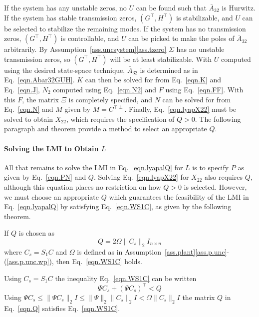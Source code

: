 \documentclass[]{../sty/JGCD}
\theoremstyle{examplestyle}
\begin{document}
  If the system has any unstable zeros, no $U$ can be found such that $\bar{A}_{32}$ is Hurwitz.
  If the system has stable transmission zeros, $(G^{\top},H^{\top})$ is stabilizable, and $U$ can be selected to stabilize the remaining modes.
  If the system has no transmission zeros, $(G^{\top},H^{\top})$ is controllable, and $U$ can be picked to make the poles of $\bar{A}_{32}$ arbitrarily.
  By Assumption~\ref{ass.uncsystem}\ref{ass.tzero} $\Sigma$ has no unstable transmission zeros, so $(G^{\top},H^{\top})$ will be at least stabilizable.
  With $U$ computed using the desired state-space technique, $\bar{A}_{32}$ is determined as in Eq.\ \eqref{eqn.Abar32GUH}.
  $K$ can then be solved for from Eq.\ \eqref{eqn.K} and Eq.\ \eqref{eqn.J}, $N_{2}$ computed using Eq.\ \eqref{eqn.N2} and $F$ using Eq.\ \eqref{eqn.FF}.
  With this $F$, the matrix $\Xi$ is completely specified, and $N$ can be solved for from Eq.\ \eqref{eqn.N} and $M$ given by $M=C^{\top\perp}$.
  Finally, Eq.\ \eqref{eqn.lyapX22} must be solved to obtain $X_{22}$, which requires the specification of $Q>0$.
  The following paragraph and theorem provide a method to select an appropriate $Q$.

  \paragraph{Solving the LMI to Obtain $L$}

  All that remains to solve the LMI in Eq.\ \eqref{eqn.lyapalQ} for $L$ is to specify $P$ as given by Eq.\ \eqref{eqn.PN} and $Q$.
  Solving Eq.\ \eqref{eqn.lyapX22} for $X_{22}$ also requires $Q$, although this equation places no restriction on how $Q>0$ is selected.
  However, we must choose an appropriate $Q$ which guarantees the feasibility of the LMI in Eq.\ \eqref{eqn.lyapalQ} by satisfying Eq.\ \eqref{eqn.WS1C}, as given by the following theorem.

  \begin{thm-dan}
    If $Q$ is chosen as
    \begin{equation}
      \label{eqn.Q}
      Q=2\Omega\|C_{s}\|_{2}I_{n\times n}
    \end{equation}
    where $C_{s}=S_{1}C$ and $\Omega$ is defined as in Assumption~\ref{ass.plant}\ref{ass.p.unc}-(\ref{ass.p.unc.wp}), then Eq.\ \eqref{eqn.WS1C} holds.
  \end{thm-dan}

  \begin{proof-dan}
    Using $C_{s}=S_{1}C$ the inequality Eq.\ \eqref{eqn.WS1C} can be written
    \begin{equation*}
      \Psi C_{s}+(\Psi C_{s})^{\top}<Q
    \end{equation*}
    Using $\Psi C_{s}\leq\|\Psi C_{s}\|_{2}I\leq\|\Psi\|_{2}\|C_{s}\|_{2}I<\Omega\|C_{s}\|_{2}I$ the matrix $Q$ in Eq.\ \eqref{eqn.Q} satisfies Eq.\ \eqref{eqn.WS1C}.
  \end{proof-dan}
\end{document}
